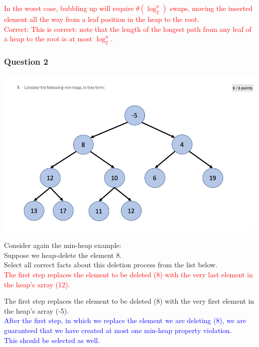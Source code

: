 \documentclass{article}
\begin{document}
\textcolor{red}{In the worst case, bubbling up will require $\theta(\log_2^n)$ swaps, moving the inserted element all the way from a leaf position in the heap to the root.\\
Correct: This is correct: note that the length of the longest path from any leaf of a heap to the root is  at most $\log_2^n$.\\}


\subsubsection{Question 2}


\includegraphics[width=\textwidth]{heapsortquestion1chart.png}



Consider again the min-heap example:\\
Suppose we heap-delete the element 8.\\

Select all correct facts about this deletion process from the list below.\\

\textcolor{red}{The first step replaces the element to be deleted (8) with the very last element in the heap's array (12).\\}

The first step replaces the element to be deleted (8) with the very first element in the heap's array (-5).\\

\textcolor{blue}{After the first step, in which we replace the element we are deleting (8), we are guaranteed that we have created at most one min-heap property violation.\\
This should be selected as well.\\}
\end{document}
